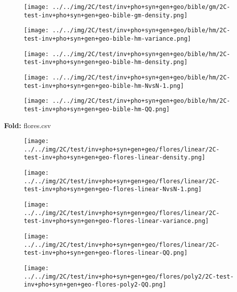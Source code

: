 \begin{figure}[H]
\centering	\texttt{[image: ../../img/2C/test/inv+pho+syn+gen+geo/bible/gm/2C-test-inv+pho+syn+gen+geo-bible-gm-density.png]}
\end{figure}
\begin{figure}[H]
\centering	\texttt{[image: ../../img/2C/test/inv+pho+syn+gen+geo/bible/hm/2C-test-inv+pho+syn+gen+geo-bible-hm-variance.png]}
\end{figure}
\begin{figure}[H]
\centering	\texttt{[image: ../../img/2C/test/inv+pho+syn+gen+geo/bible/hm/2C-test-inv+pho+syn+gen+geo-bible-hm-density.png]}
\end{figure}
\begin{figure}[H]
\centering	\texttt{[image: ../../img/2C/test/inv+pho+syn+gen+geo/bible/hm/2C-test-inv+pho+syn+gen+geo-bible-hm-NvsN-1.png]}
\end{figure}
\begin{figure}[H]
\centering	\texttt{[image: ../../img/2C/test/inv+pho+syn+gen+geo/bible/hm/2C-test-inv+pho+syn+gen+geo-bible-hm-QQ.png]}
\end{figure}
\textbf{Fold:} flores.csv
\begin{figure}[H]
\centering	\texttt{[image: ../../img/2C/test/inv+pho+syn+gen+geo/flores/linear/2C-test-inv+pho+syn+gen+geo-flores-linear-density.png]}
\end{figure}
\begin{figure}[H]
\centering	\texttt{[image: ../../img/2C/test/inv+pho+syn+gen+geo/flores/linear/2C-test-inv+pho+syn+gen+geo-flores-linear-NvsN-1.png]}
\end{figure}
\begin{figure}[H]
\centering	\texttt{[image: ../../img/2C/test/inv+pho+syn+gen+geo/flores/linear/2C-test-inv+pho+syn+gen+geo-flores-linear-variance.png]}
\end{figure}
\begin{figure}[H]
\centering	\texttt{[image: ../../img/2C/test/inv+pho+syn+gen+geo/flores/linear/2C-test-inv+pho+syn+gen+geo-flores-linear-QQ.png]}
\end{figure}
\begin{figure}[H]
\centering	\texttt{[image: ../../img/2C/test/inv+pho+syn+gen+geo/flores/poly2/2C-test-inv+pho+syn+gen+geo-flores-poly2-QQ.png]}
\end{figure}
